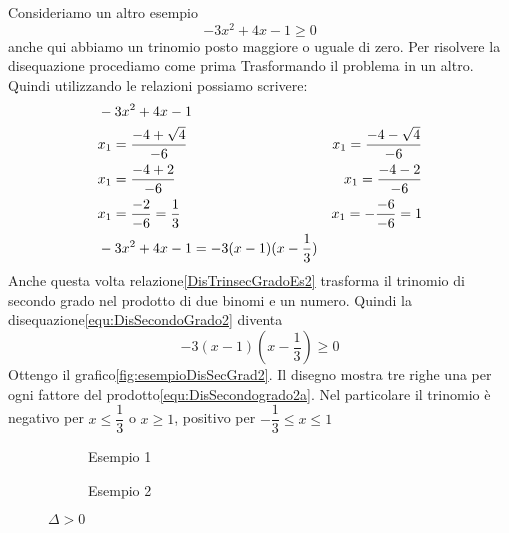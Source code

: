 Consideriamo un altro esempio
\begin{equation}
-3x^2+4x-1\geq 0\label{equ:DisSecondoGrado2}
\end{equation} 
anche qui abbiamo un trinomio posto maggiore o uguale di zero. Per risolvere la disequazione  procediamo come prima  Trasformando  il problema in un altro. 
Quindi utilizzando le relazioni\nobs{} possiamo scrivere: 
\begin{align}
&-3x^2+4x-1\\
&x_{1}=\dfrac{-4+\sqrt{4}}{-6}\notag
&x_{1}=\dfrac{-4-\sqrt{4}}{-6}\notag\\
&x_{1}=\dfrac{-4+2}{-6}\notag
&x_{1}=\dfrac{-4-2}{-6}\notag\\
&x_{1}=\dfrac{-2}{-6}=\dfrac{1}{3}\notag
&x_{1}=-\dfrac{-6}{-6}=1\notag\\
&-3x^2+4x-1=-3(x-1)(x-\dfrac{1}{3})\label{DisTrinsecGradoEs2}
\end{align}
Anche questa volta relazione\nobs\vref{DisTrinsecGradoEs2} trasforma il trinomio di secondo grado nel prodotto di due binomi e un numero. Quindi la disequazione\nobs\vref{equ:DisSecondoGrado2} diventa 
\begin{equation}
-3(x-1)(x-\dfrac{1}{3})\geq 0\label{equ:DisSecondogrado2a}
\end{equation} 
Ottengo il grafico\nobs\vref{fig:esempioDisSecGrad2}. Il disegno mostra tre righe una per ogni fattore del prodotto\nobs\vref{equ:DisSecondogrado2a}. Nel particolare il trinomio è negativo per $x\leq\dfrac{1}{3}$ o $x\geq 1$, positivo per $-\dfrac{1}{3}\leq x\leq 1$
\begin{figure}
	\centering
		\begin{subfigure}[b]{.4\linewidth}
			\centering
			
			\caption{Esempio 1}
			\label{fig:esempioDisSecGrad1}
		\end{subfigure}%
	\centering
	\begin{subfigure}[b]{.4\linewidth}
			\centering
			
			\caption{Esempio 2}
			\label{fig:esempioDisSecGrad2}
	\end{subfigure}%
\caption{$\Delta>0$}
\label{fig:DeltaMagZeroEsempio1}
\end{figure}

